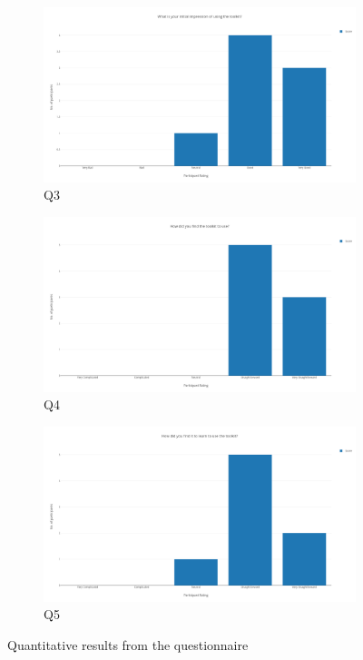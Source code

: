 \documentclass{l4proj}
\begin{document}
\begin{figure}[h]
\begin{subfigure}[h]{0.45\linewidth}
\includegraphics[width=\linewidth]{dissertation/eval_2_q3.png}
\caption{Q3}
\end{subfigure}
\hfill
\begin{subfigure}[h]{0.45\linewidth}
\includegraphics[width=\linewidth]{dissertation/eval_2_q4.png}
\caption{Q4}
\end{subfigure}
\hfill
\begin{subfigure}[h]{0.45\linewidth}
\includegraphics[width=\linewidth]{dissertation/eval_2_q5.png}
\caption{Q5}
\end{subfigure}
\hfill
\caption{Quantitative results from the questionnaire}
\end{figure}
\end{document}
